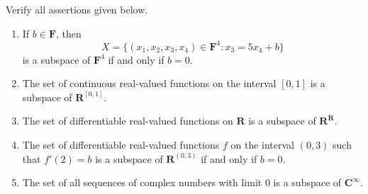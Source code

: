 \begin{exercise}
Verify all assertions given below.
\begin{enumerate}
\item[(a)] If $b \in \mathbf{F}$, then
\[
X = \{(x_1, x_2, x_3, x_4) \in \mathbf{F}^4 : x_3 = 5x_4 + b\}
\]
is a subspace of $\mathbf{F}^4$ if and only if $b = 0$.
\item[(b)] The set of continuous real-valued functions on the interval $[0, 1]$ is a subspace of $\mathbf{R}^{[0,1]}$.
\item[(c)] The set of differentiable real-valued functions on $\mathbf{R}$ is a subspace of $\mathbf{R}^{\mathbf{R}}$.
\item[(d)] The set of differentiable real-valued functions $f$ on the interval $(0, 3)$ such that $f'(2) = b$ is a subspace of $\mathbf{R}^{(0,3)}$ if and only if $b = 0$.
\item[(e)] The set of all sequences of complex numbers with limit $0$ is a subspace of $\mathbf{C}^{\infty}$.
\end{enumerate}
\end{exercise}

